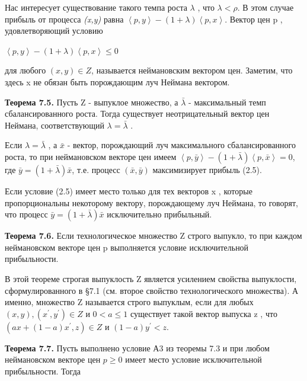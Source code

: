 \documentclass[12pt, 4paper]{book}
\begin{document}
{Нас интересует существование такого темпа роста $\lambda$ , что $\lambda < \rho$. В этом случае прибыль от процесса \textit{(x,y)} равна $\left\langle p,y \right\rangle-(1+\lambda) \left\langle p,x\right\rangle$. Вектор цен p , удовлетворяющий условию
\begin{center}
$\left\langle p,y \right\rangle-(1+\lambda) \left\langle p,x\right\rangle \leq 0$ 
\end{center}
для любого $(x,y) \in Z$, называется неймановским вектором цен. Заметим, что здесь x не обязан быть порождающим луч Неймана вектором.
\par

\textbf{Теорема 7.5.} Пусть Z - выпуклое множество, а $\bar{\lambda}$ - максимальный темп сбалансированного роста. Тогда существует неотрицательный вектор цен Неймана, соответствующий $\lambda = \bar{\lambda}$ .
\par

Если $\lambda = \bar{\lambda}$ , а $\bar{x}$ - вектор, порождающий луч максимального сбалансированного роста, то при неймановском векторе цен имеем $\left\langle p,\bar{y} \right\rangle - (1+ \bar{\lambda})\left\langle p,\bar{x}\right\rangle = 0$, где $\bar{y}=(1 + \bar{\lambda})\bar{x}$, т.е. процесс $(\bar{x},\bar{y})$ максимизирует прибыль (2.5).
\par

Если условие (2.5) имеет место только для тех векторов x , которые пропорциональны некоторому вектору, порождающему луч Неймана, то говорят, что процесс $\bar{y}= (1+ \bar{\lambda})\bar{x}$ исключительно прибыльный.
\par

\textbf{Теорема 7.6.} Если технологическое множество Z строго выпукло, то при каждом неймановском векторе цен p выполняется условие исключительной прибыльности.
\par

В этой теореме строгая выпуклость Z является усилением свойства выпуклости, сформулированного в §7.1 (см. второе свойство технологического множества). А именно, множество Z называется строго выпуклым, если для любых $(x,y),(x^{'},y^{'})\in Z$ и $0 < a \leq 1$  существует такой вектор выпуска z , что $(ax + (1-a)x^{'},z) \in Z$  и $(1-a)y^{'} < z$.
\par

\textbf{Теорема 7.7. }Пусть выполнено условие А3 из теоремы 7.3 и при любом неймановском векторе цен $p \geq 0$ имеет место условие исключительной прибыльности. Тогда 
\par

}
\end{document}
